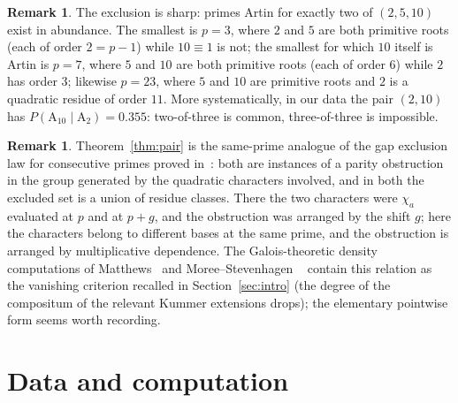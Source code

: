 \documentclass[11pt,reqno]{amsart}
\theoremstyle{plain}
\theoremstyle{definition}
\newtheorem{remark}[theorem]{Remark}
\newcommand{\Art}{\mathrm{A}}
\begin{document}
\begin{remark}
The exclusion is sharp: primes Artin for exactly two of $(2,5,10)$ exist in
abundance. The smallest is $p = 3$, where $2$ and $5$ are both primitive roots
(each of order $2 = p-1$) while $10 \equiv 1$ is not; the smallest for which
$10$ itself is Artin is $p = 7$, where $5$ and $10$ are both primitive
roots (each of order $6$) while $2$ has order $3$; likewise $p = 23$, where
$5$ and $10$ are primitive roots and $2$ is a quadratic residue of order
$11$. More systematically, in our data the pair
$(2, 10)$ has $P(\Art_{10} \mid \Art_2) = 0.355$: two-of-three is common,
three-of-three is impossible.
\end{remark}

\begin{remark}
Theorem~\ref{thm:pair} is the same-prime analogue of the gap exclusion law
for consecutive primes proved in~\cite{BaldII}: both are
instances of a parity obstruction in the group generated by the quadratic
characters involved, and in both the excluded set is a union of residue
classes. There the two characters were $\chi_a$ evaluated at $p$
and at $p + g$, and the obstruction was arranged by the shift $g$; here the
characters belong to different bases at the same prime, and the obstruction
is arranged by multiplicative dependence. The Galois-theoretic density
computations of Matthews~\cite{Matthews1976} and Moree--Stevenhagen%
~\cite{MoreeStevenhagen2014} contain this relation as the vanishing criterion
recalled in Section~\ref{sec:intro} (the degree of the compositum of the
relevant Kummer extensions drops); the elementary pointwise form seems worth
recording.
\end{remark}

\section{Data and computation}
\label{sec:data}
\end{document}
